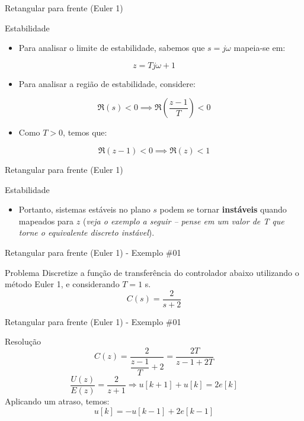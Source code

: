 \begin{frame}{Retangular para frente (Euler 1)}
\begin{block}{Estabilidade}
\begin{itemize}
\item Para analisar o limite de estabilidade, sabemos que $ s=j\omega $ mapeia-se em:
\end{itemize}
$$ z=Tj\omega+1 $$
\begin{itemize}
\item Para analisar a região de estabilidade, considere:
\end{itemize}
$$\Re(s) < 0 \implies \Re \left(\dfrac{z-1}{T}\right) < 0$$
\begin{itemize}
\vspace{-0.3cm}
\item[] Como $T > 0$, temos que:
\end{itemize}
$$\Re(z-1) < 0 \implies \Re(z) < 1$$
\end{block}
\end{frame}

\begin{frame}{Retangular para frente (Euler 1)}
\begin{block}{Estabilidade}
\begin{itemize}	
\item Portanto, sistemas estáveis no plano $ s $ podem se tornar \textbf{instáveis} quando mapeados para $ z $ (\textit{veja o exemplo a seguir -- pense em um valor de T que torne o equivalente discreto instável}).
\end{itemize}
\end{block}
\centering
\vspace{0.2cm}
\scalebox{0.9}{}
\end{frame}

\begin{frame}{Retangular para frente (Euler 1) - Exemplo \#01}
\begin{block}{Problema}
Discretize a função de transferência do controlador abaixo utilizando o método Euler 1, e considerando $T= \num{1}$ s.
	\[ C(s)=\dfrac{2}{s+2} \]
\end{block}
\end{frame}


\begin{frame}{Retangular para frente (Euler 1) - Exemplo \#01}
\begin{block}{Resolução}
	\[ C(z)=\dfrac{2}{\dfrac{z-1}{T}+2}=\dfrac{2T}{z-1+2T} \]
	\[ \dfrac{U(z)}{E(z)}=\dfrac{\num{2}}{z+\num{1}}\Rightarrow u[k+1]+u[k]=\num{2}e[k] \]
	Aplicando um atraso, temos:
	\[ u[k]=-u[k-1]+\num{2}e[k-1] \]
\end{block}
\end{frame}


